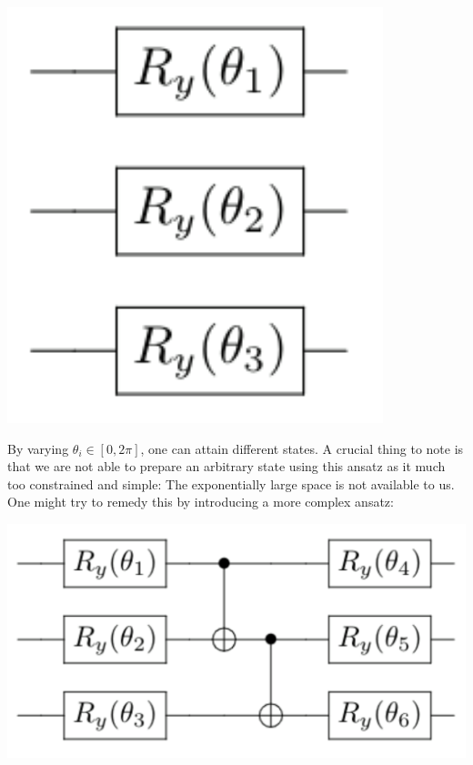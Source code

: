 \documentclass[%
oneside,                 %
final,                   %
10pt]{article}
\begin{document}
\vspace{6mm}

\centerline{\includegraphics[width=0.6\linewidth]{figures/simple_ansatz.png}}

\vspace{6mm}




By varying $\theta_i \in [0, 2\pi]$, one can attain different states. A crucial thing to note is that we are not
able to prepare an arbitrary state using this ansatz as it much too constrained and simple: The exponentially large
space is not available to us. One might try to remedy this by introducing a more complex ansatz:



\vspace{6mm}

\centerline{\includegraphics[width=1.0\linewidth]{figures/advanced_ansatz.png}}

\vspace{6mm}
\end{document}
